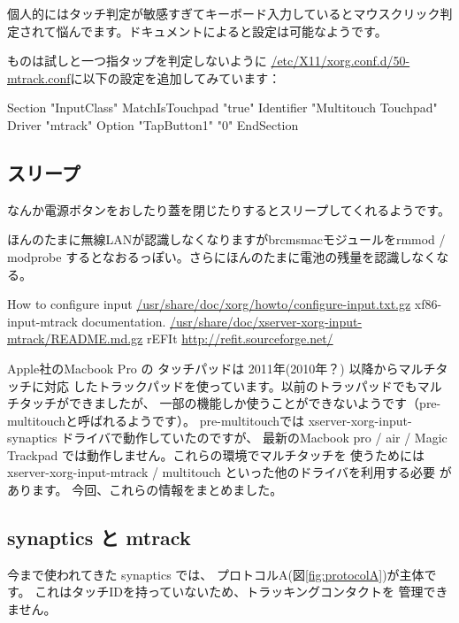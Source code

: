 \documentclass[mingoth,a4paper]{jsarticle}
\begin{document}
個人的にはタッチ判定が敏感すぎてキーボード入力しているとマウスクリック判
定されて悩んでます。ドキュメント\cite{xorg-configure-input,mtrack-doc}によると設定は可能なようです。

ものは試しと一つ指タップを判定しないように
\url{/etc/X11/xorg.conf.d/50-mtrack.conf}に以下の設定を追加してみています：

\begin{commandline}
Section "InputClass"
	MatchIsTouchpad "true"
	Identifier "Multitouch Touchpad"
	Driver "mtrack"
	Option "TapButton1" "0"
EndSection
\end{commandline}


\subsection{スリープ}

なんか電源ボタンをおしたり蓋を閉じたりするとスリープしてくれるようです。

ほんのたまに無線LANが認識しなくなりますがbrcmsmacモジュールをrmmod / modprobe
するとなおるっぽい。さらにほんのたまに電池の残量を認識しなくなる。

\begin{thebibliography}{0}
	How to configure input
	\url{/usr/share/doc/xorg/howto/configure-input.txt.gz}
	xf86-input-mtrack documentation.
	\url{/usr/share/doc/xserver-xorg-input-mtrack/README.md.gz}
 rEFIt \url{http://refit.sourceforge.net/}
\end{thebibliography}


Apple社のMacbook Pro の タッチパッドは 2011年(2010年？) 以降からマルチタッチに対応
したトラックパッドを使っています。以前のトラッパッドでもマルチタッチができましたが、
一部の機能しか使うことができないようです（pre-multitouchと呼ばれるようです）。
pre-multitouchでは xserver-xorg-input-synaptics ドライバで動作していたのですが、
最新のMacbook pro / air / Magic Trackpad では動作しません。これらの環境でマルチタッチを
使うためには xserver-xorg-input-mtrack / multitouch といった他のドライバを利用する必要
があります。
今回、これらの情報をまとめました。

\subsection{synaptics と mtrack}
今まで使われてきた synaptics では、
プロトコルA(図\ref{fig:protocolA})が主体です。
これはタッチIDを持っていないため、トラッキングコンタクトを
管理できません。
\end{document}
